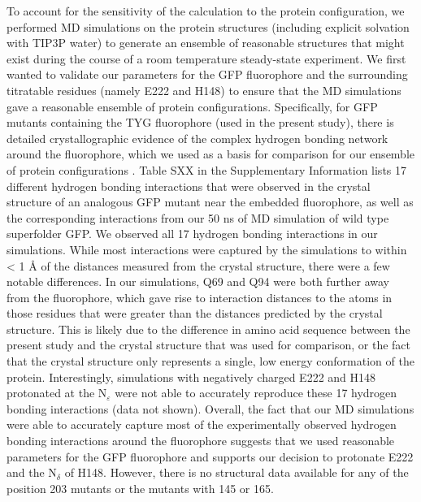To account for the sensitivity of the calculation to the protein configuration, we performed MD simulations on the protein structures (including explicit solvation with TIP3P water) to generate an ensemble of reasonable structures that might exist during the course of a room temperature steady-state experiment.
We first wanted to validate our parameters for the GFP fluorophore and the surrounding titratable residues (namely E222 and H148) to ensure that the MD simulations gave a reasonable ensemble of protein configurations.
Specifically, for GFP mutants containing the TYG fluorophore (used in the present study), there is detailed crystallographic evidence of the complex hydrogen bonding network around the fluorophore, which we used as a basis for comparison for our ensemble of protein configurations \cite{Elsliger1999}.
Table SXX in the Supplementary Information lists 17 different hydrogen bonding interactions that were observed in the crystal structure of an analogous GFP mutant near the embedded fluorophore, as well as the corresponding interactions from our 50 \si{\ns} of MD simulation of wild type superfolder GFP.
We observed all 17 hydrogen bonding interactions in our simulations.
While most interactions were captured by the simulations to within < 1 \si{\angstrom} of the distances measured from the crystal structure, there were a few notable differences.
In our simulations, Q69 and Q94 were both further away from the fluorophore, which gave rise to interaction distances to the atoms in those residues that were greater than the distances predicted by the crystal structure.
This is likely due to the difference in amino acid sequence between the present study and the crystal structure that was used for comparison, or the fact that the crystal structure only represents a single, low energy conformation of the protein.
Interestingly, simulations with negatively charged E222 and H148 protonated at the N$_{\varepsilon}$ were not able to accurately reproduce these 17 hydrogen bonding interactions (data not shown).
Overall, the fact that our MD simulations were able to accurately capture most of the experimentally observed hydrogen bonding interactions around the fluorophore suggests that we used reasonable parameters for the GFP fluorophore and supports our decision to protonate E222 and the N$_\delta$ of H148.
However, there is no structural data available for any of the position 203 mutants or the mutants with \pCNF{} 145 or 165.

